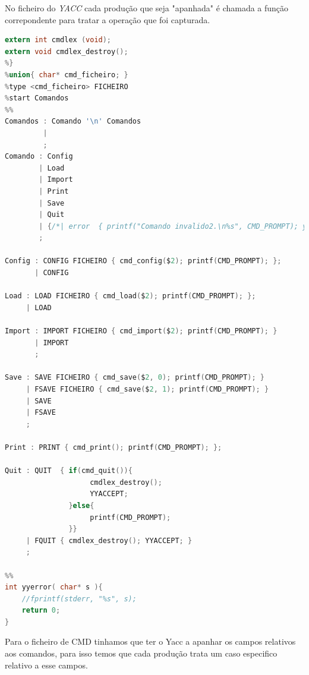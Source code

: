 \documentclass[11pt, a4paper, oneside]{article}
\begin{document}
No ficheiro do \textit{YACC} cada produção que seja "apanhada" é chamada a função correpondente para tratar a operação que foi capturada.

\begin{lstlisting}[language=C, caption={YACC do ficheiro cmd.}]
extern int cmdlex (void);
extern void cmdlex_destroy();
%}
%union{ char* cmd_ficheiro; }
%type <cmd_ficheiro> FICHEIRO
%start Comandos
%%
Comandos : Comando '\n' Comandos
         | 
         ;
Comando : Config
        | Load
        | Import
        | Print
        | Save
        | Quit
        | {/*| error  { printf("Comando invalido2.\n%s", CMD_PROMPT); yyclearin; yyerrok; }*/}
        ;

Config : CONFIG FICHEIRO { cmd_config($2); printf(CMD_PROMPT); };
       | CONFIG

Load : LOAD FICHEIRO { cmd_load($2); printf(CMD_PROMPT); };
     | LOAD

Import : IMPORT FICHEIRO { cmd_import($2); printf(CMD_PROMPT); }
       | IMPORT
       ;

Save : SAVE FICHEIRO { cmd_save($2, 0); printf(CMD_PROMPT); }
     | FSAVE FICHEIRO { cmd_save($2, 1); printf(CMD_PROMPT); }
     | SAVE
     | FSAVE
     ;

Print : PRINT { cmd_print(); printf(CMD_PROMPT); };

Quit : QUIT  { if(cmd_quit()){
                    cmdlex_destroy();
                    YYACCEPT;
               }else{
                    printf(CMD_PROMPT);
               }}
     | FQUIT { cmdlex_destroy(); YYACCEPT; }
     ;

%%
int yyerror( char* s ){
    //fprintf(stderr, "%s", s);
    return 0;
}
\end{lstlisting} 

Para o ficheiro de CMD tinhamos que ter o Yacc a apanhar os campos relativos aos comandos, para isso temos que cada produção trata um caso especifico relativo a esse campos.
\end{document}
